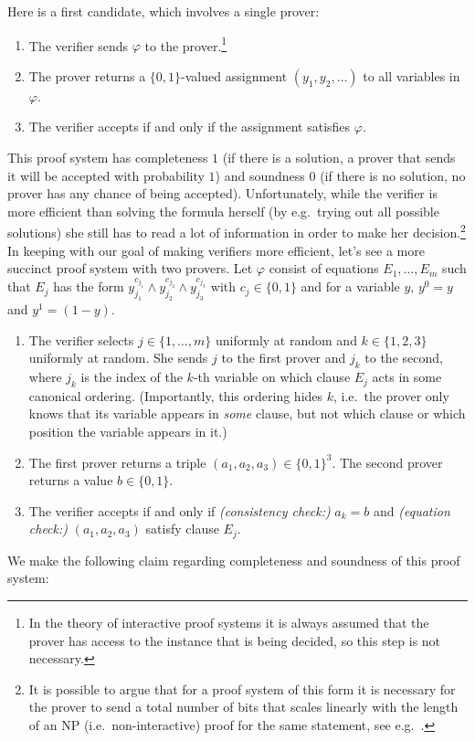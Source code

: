 Here is a first candidate, which involves a single prover:
\begin{enumerate}
\item The verifier sends $\varphi$ to the prover.\footnote{In the theory of interactive proof systems it is always assumed that the prover has access to the instance that is being decided, so this step is not necessary.}
\item The prover returns a $\{0,1\}$-valued assignment $(y_1,y_2,\ldots)$ to all variables in $\varphi$.
\item The verifier accepts if and only if the assignment satisfies $\varphi$. 
\end{enumerate}
This proof system has completeness $1$ (if there is a solution, a prover that sends it will be accepted with probability $1$) and soundness $0$ (if there is no solution, no prover has any chance of being accepted). Unfortunately, while the verifier is more efficient than solving the formula herself (by e.g.\ trying out all possible solutions) she still has to read a lot of information in order to make her decision.\footnote{It is possible to argue that for a proof system of this form it is necessary for the prover to send a total number of bits that scales linearly with the length of an NP (i.e.\ non-interactive) proof for the same statement, see e.g.~\cite{goldreich2001interactive}.} In keeping with our goal of making verifiers more efficient, let's see a more succinct proof system with two provers. Let $\varphi$ consist of equations $E_1,\ldots,E_m$ such that $E_j$ has the form $y_{j_1}^{c_{j_1}}\wedge y_{j_2}^{c_{j_2}}\wedge  y_{j_3}^{c_{j_3}}$ with $c_j\in\{0,1\}$ and for a variable $y$, $y^0=y$ and $y^1=(1-y)$.
\begin{enumerate}
\item The verifier selects $j \in \{1,\ldots,m\}$ uniformly at random and $k\in\{1,2,3\}$ uniformly at random. She sends $j$ to the first prover and $j_k$ to the second, where $j_k$ is the index of the $k$-th variable on which clause $E_j$ acts in some canonical ordering. (Importantly, this ordering hides $k$, i.e.\ the prover only knows that its variable appears in \emph{some} clause, but not which clause or which position the variable appears in it.)
\item The first prover returns a triple $(a_1,a_2,a_3)\in \{0, 1\}^3$. The second prover returns a value $b\in \{0,1\}$. 
\item The verifier accepts if and only if \emph{(consistency check:)} $a_k = b$ and \emph{(equation check:)} $(a_1,a_2,a_3)$ satisfy clause $E_j$. 
\end{enumerate}
We make the following claim regarding completeness and soundness of this proof system:

